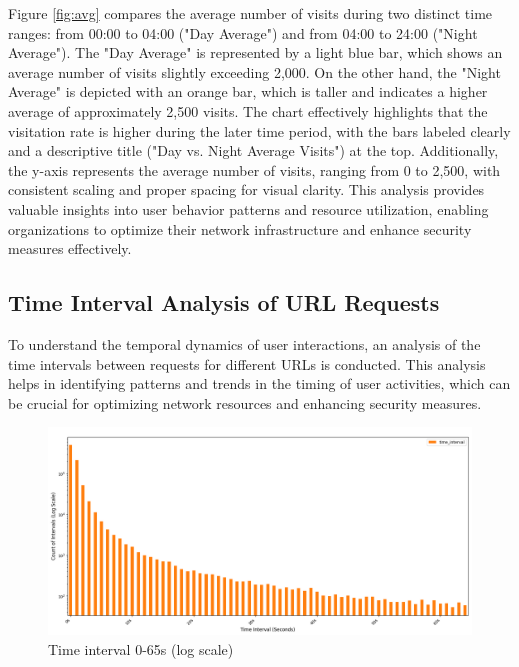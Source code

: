 Figure \ref{fig:avg} compares the average number of visits during two distinct time ranges: from 00:00 to 04:00 ("Day Average") and from 04:00 to 24:00 ("Night Average"). The "Day Average" is represented by a light blue bar, which shows an average number of visits slightly exceeding 2,000. On the other hand, the "Night Average" is depicted with an orange bar, which is taller and indicates a higher average of approximately 2,500 visits. The chart effectively highlights that the visitation rate is higher during the later time period, with the bars labeled clearly and a descriptive title ("Day vs. Night Average Visits") at the top. Additionally, the y-axis represents the average number of visits, ranging from 0 to 2,500, with consistent scaling and proper spacing for visual clarity. This analysis provides valuable insights into user behavior patterns and resource utilization, enabling organizations to optimize their network infrastructure and enhance security measures effectively.

\subsection{Time Interval Analysis of URL Requests}
To understand the temporal dynamics of user interactions, an analysis of the time intervals between requests for different URLs is conducted. This analysis helps in identifying patterns and trends in the timing of user activities, which can be crucial for optimizing network resources and enhancing security measures.

\begin{figure}
    \centering
    \includegraphics[width=\textwidth]{../Thesis_Docs/media/seconds.png}
    \caption{Time interval 0-65s (log scale) }
    \label{fig:timeintervallog}
\end{figure}


